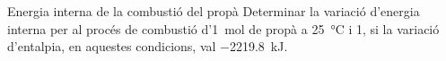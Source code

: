 \begin{exr}{Energia interna de la combustió del propà}
Determinar la variació d'energia interna per al procés de combustió d'\qty{1}{\mol} de propà a \qty{25}{\celsius} i \qty{1}{\atm}, si la variació d'entalpia, en aquestes condicions, val \qty{-2219.8}{\kilo\joule}.
\end{exr}

